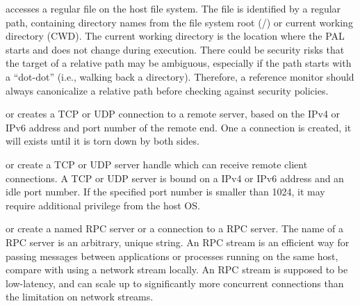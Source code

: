 \begin{compactitem}

\item {} accesses a regular file on the host file system.
The file is identified by a regular path,
containing directory names from the file system root (/) or current working directory (CWD).
The current working directory is the location where the PAL starts and does not change during execution.
There could be security risks
that the target of a relative path may be ambiguous, especially if the path starts with a ``dot-dot'' (i.e., walking back a directory).
Therefore, a reference monitor should always canonicalize a relative path before checking against security policies.

\item {} or  creates a TCP or UDP connection to a remote server,
based on the IPv4 or IPv6 address and port number of the remote end.
One a connection is created,
it will exists until it is torn down by both sides.

\item {} or  create a TCP or UDP server handle which can receive remote client connections.
A TCP or UDP server is bound on a IPv4 or IPv6 address and an idle port number.
If the specified port number is smaller than 1024,
it may require additional privilege from the host OS.

\item {} or  create a named RPC server or a connection to a RPC server.
The name of a RPC server is an arbitrary, unique string.
An RPC stream is an efficient way for passing messages between applications or processes
running on the same host,
compare with using a network stream locally.
An RPC stream is supposed to be low-latency, and can scale up to significantly
more concurrent connections
than the limitation on network streams.


\end{compactitem}



